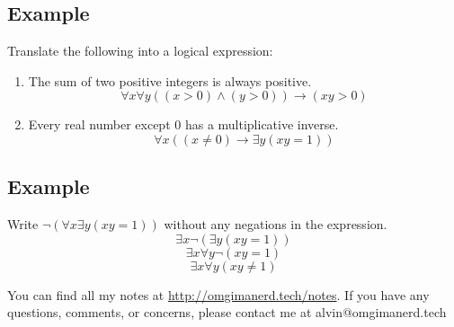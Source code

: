 \documentclass{math}
\begin{document}
\subsection*{Example}
Translate the following into a logical expression:
\begin{enumerate}
  \item The sum of two positive integers is always positive.
  \[ \forall{x}\forall{y}((x > 0) \wedge (y > 0)) \to (xy > 0) \]
  \item Every real number except 0 has a multiplicative inverse.
  \[ \forall{x}((x \neq 0) \to \exists{y}(xy = 1)) \]
\end{enumerate}

\subsection*{Example}
Write \( \neg{(\forall{x}\exists{y}(xy = 1))} \) without any negations
in the expression.
\[ \exists{x}\neg{(\exists{y}(xy=1))} \]
\[ \exists{x}\forall{y}\neg{(xy=1)} \]
\[ \exists{x}\forall{y}(xy \neq 1) \]

\begin{center}
  You can find all my notes at \url{http://omgimanerd.tech/notes}. If you have
  any questions, comments, or concerns, please contact me at
  alvin@omgimanerd.tech
\end{center}
\end{document}

